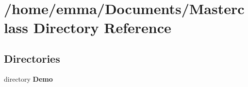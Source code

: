 \section{/home/emma/\+Documents/\+Masterclass Directory Reference}
\label{dir_9be6b135846aff1ffdbeddc87040ec15}
\subsection*{Directories}
\begin{DoxyCompactItemize}
\item 
directory \textbf{ Demo}
\end{DoxyCompactItemize}
